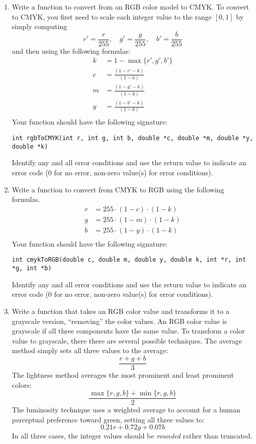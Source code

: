 \documentclass[12pt]{scrartcl}
\begin{document}
\begin{enumerate}
\item Write a function to convert from an RGB color model to CMYK.  To 
convert to CMYK, you first need to scale each integer value to the range 
$[0, 1]$ by simply computing
	$$r' = \frac{r}{255}, \quad g' = \frac{g}{255}, \quad b' = \frac{b}{255}$$
	and then using the following formulas:
\begin{align*}
k & = 1-\max\{r', g', b'\} \\
c & = \frac{(1-r'-k)}{(1-k)} \\
m & = \frac{(1-g'-k)}{(1-k)} \\
y & = \frac{(1-b'-k)}{(1-k)} \\
\end{align*}
Your function should have the following signature:

\texttt{int rgbToCMYK(int r, int g, int b, double *c, double *m, double *y, double *k)}

Identify any and all error conditions and use the return value to indicate
an error code (0 for no error, non-zero value(s) for error conditions).

\item Write a function to convert from CMYK to RGB using the following formulas.
\begin{align*}
r & = 255 \cdot (1 - c) \cdot (1-k) \\
g & = 255 \cdot (1 - m) \cdot (1-k) \\
b & = 255 \cdot (1 - y) \cdot (1-k) \\
\end{align*}
Your function should have the following signature:

\texttt{int cmykToRGB(double c, double m, double y, double k, int *r, int *g, int *b)}

Identify any and all error conditions and use the return value to indicate
an error code (0 for no error, non-zero value(s) for error conditions).

\item Write a function that takes an RGB color value and transforms it 
to a grayscale version, ``removing'' the color values.  An RGB color 
value is grayscale if all three components have the same value.  To 
transform a color value to grayscale, there there are several possible 
techniques.  The average method simply sets all three values to the 
average:
  $$\frac{r + g + b}{3}$$
The lightness method averages the most prominent and least prominent 
colors:
  $$\frac{\max\{r, g, b\} + \min\{r, g, b\}}{2}$$
The luminosity technique uses a weighted average to account for a human 
perceptual preference toward green, setting all three values to:
  $$0.21 r + 0.72 g + 0.07 b$$
In all three cases, the integer values should be \emph{rounded} rather 
than truncated.


\end{enumerate}
\end{document}
